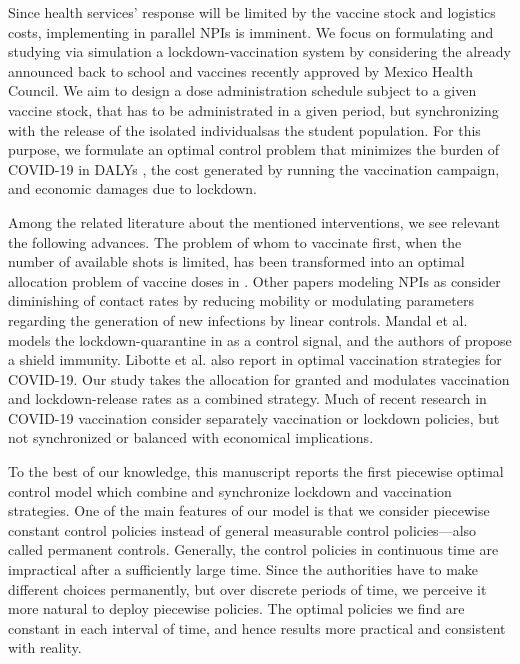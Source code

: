     Since health services' response will be limited by the vaccine stock and
logistics costs, implementing in parallel NPIs is imminent. We focus on
formulating and studying via simulation a lockdown-vaccination system by
considering the already announced back to school and vaccines recently approved
by Mexico Health Council. We aim to design a dose administration
schedule subject to a given vaccine stock, that has to be administrated in a
given period, but synchronizing with the release of the isolated
individuals\textemdash as the student population. For this purpose, we
formulate an optimal control problem that minimizes the burden of COVID-19 in
DALYs \cite{WhoDALY}, the cost generated by running the vaccination campaign,
and economic damages due to lockdown.


%
    Among the related literature about the mentioned interventions, we see
relevant the following advances. The problem of whom to vaccinate first, when
the number of available shots is limited, has been transformed into an optimal
allocation problem of vaccine doses in \cite{Bubar2020,Matrajt2020,Buckner2020}.
Other papers modeling NPIs as \cite{Naraigh2020,Ullah2020} consider diminishing
of contact rates by reducing mobility or modulating parameters regarding the
generation of new infections by linear controls. Mandal et al. models the
lockdown-quarantine in \cite{Mandal2020} as a control signal, and the authors
of \cite{Weitz2020} propose a shield immunity. Libotte et al. also report in
\cite{Libotte2020} optimal vaccination strategies for COVID-19. Our study takes
the allocation for granted and modulates vaccination and lockdown-release rates
as a combined strategy. Much of recent research in COVID-19 vaccination
consider separately vaccination or lockdown policies, but not synchronized or
balanced with economical implications.

    To the best of our knowledge, this manuscript reports the first piecewise
optimal control model which combine and synchronize lockdown and vaccination
strategies. One of the main features of our model is that we consider piecewise
constant control policies instead of general measurable control policies---also
called permanent controls. Generally,  the control policies in continuous time
are impractical after a sufficiently large time. Since the authorities have to
make different choices permanently, but over discrete periods of time, we
perceive it more natural to deploy piecewise policies. The optimal policies we
find are constant in each interval of time, and hence results more practical and
consistent with reality.

